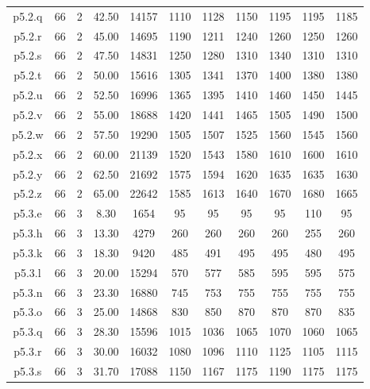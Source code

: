 \begin{center}
\begin{tabular}{ |c|c|c|c|c|c|c|c|c|c|c| }
p5.2.q & 66 & 2 & 42.50 & 14157 & 1110 & 1128 & 1150 & 1195 & 1195 & 1185  \\
p5.2.r & 66 & 2 & 45.00 & 14695 & 1190 & 1211 & 1240 & 1260 & 1250 & 1260  \\
p5.2.s & 66 & 2 & 47.50 & 14831 & 1250 & 1280 & 1310 & 1340 & 1310 & 1310  \\
p5.2.t & 66 & 2 & 50.00 & 15616 & 1305 & 1341 & 1370 & 1400 & 1380 & 1380  \\
p5.2.u & 66 & 2 & 52.50 & 16996 & 1365 & 1395 & 1410 & 1460 & 1450 & 1445  \\
p5.2.v & 66 & 2 & 55.00 & 18688 & 1420 & 1441 & 1465 & 1505 & 1490 & 1500  \\
p5.2.w & 66 & 2 & 57.50 & 19290 & 1505 & 1507 & 1525 & 1560 & 1545 & 1560  \\
p5.2.x & 66 & 2 & 60.00 & 21139 & 1520 & 1543 & 1580 & 1610 & 1600 & 1610  \\
p5.2.y & 66 & 2 & 62.50 & 21692 & 1575 & 1594 & 1620 & 1635 & 1635 & 1630  \\
p5.2.z & 66 & 2 & 65.00 & 22642 & 1585 & 1613 & 1640 & 1670 & 1680 & 1665  \\
p5.3.e & 66 & 3 & 8.30 & 1654 & 95 & 95 & 95 & 95 & 110 & 95  \\
p5.3.h & 66 & 3 & 13.30 & 4279 & 260 & 260 & 260 & 260 & 255 & 260  \\
p5.3.k & 66 & 3 & 18.30 & 9420 & 485 & 491 & 495 & 495 & 480 & 495  \\
p5.3.l & 66 & 3 & 20.00 & 15294 & 570 & 577 & 585 & 595 & 595 & 575  \\
p5.3.n & 66 & 3 & 23.30 & 16880 & 745 & 753 & 755 & 755 & 755 & 755  \\
p5.3.o & 66 & 3 & 25.00 & 14868 & 830 & 850 & 870 & 870 & 870 & 835  \\
p5.3.q & 66 & 3 & 28.30 & 15596 & 1015 & 1036 & 1065 & 1070 & 1060 & 1065  \\
p5.3.r & 66 & 3 & 30.00 & 16032 & 1080 & 1096 & 1110 & 1125 & 1105 & 1115  \\
p5.3.s & 66 & 3 & 31.70 & 17088 & 1150 & 1167 & 1175 & 1190 & 1175 & 1175  \\
\hline
\end{tabular}
\end{center}

